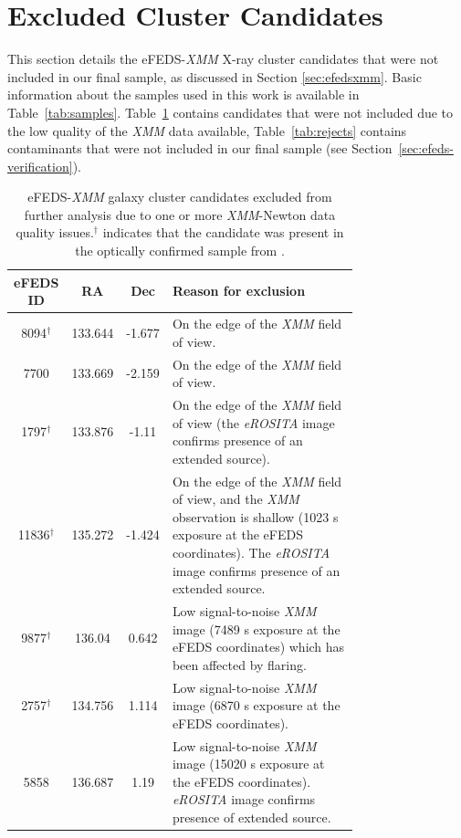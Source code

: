 \documentclass[fleqn,usenatbib]{mnras}
\begin{document}
\section{Excluded Cluster Candidates}
\label{app:rejected}

This section details the eFEDS-{\em XMM} X-ray cluster candidates that were not included in our final sample, as discussed in Section \ref{sec:efedsxmm}. Basic information about the samples used in this work is available in Table~\ref{tab:samples}. Table~\ref{tab:xmmrejects} contains candidates that were not included due to the low quality of the {\em XMM} data available, Table~\ref{tab:rejects} contains contaminants that were not included in our final sample (see Section~\ref{sec:efeds-verification}).

\begin{table}
\begin{center}
\caption[]{{eFEDS-{\em XMM} galaxy cluster candidates excluded from further analysis due to one or more {\em XMM}-Newton data quality issues.\newline $^\dagger$ indicates that the candidate was present in the optically confirmed sample from \cite{efedsclusteropticalcat}.}\label{tab:xmmrejects}}
\vspace{1mm}
\begin{tabular}{ccc|p{0.75\linewidth}}
\hline
\hline
eFEDS ID & RA & Dec & Reason for exclusion\\
\hline
\hline
8094$^\dagger$ & 133.644 & -1.677 & On the edge of the {\em XMM} field of view. \\ 
\hline
7700 & 133.669 & -2.159 & On the edge of the {\em XMM} field of view. \\ 
\hline
1797$^\dagger$ & 133.876 & -1.11 & On the edge of the {\em XMM} field of view (the {\em eROSITA} image confirms presence of an extended source). \\ 
\hline
11836$^\dagger$ & 135.272 & -1.424 & On the edge of the {\em XMM} field of view, and the {\em XMM} observation is shallow (1023 s exposure at the eFEDS coordinates). The {\em eROSITA} image confirms presence of an extended source. \\ 
\hline
9877$^\dagger$ & 136.04 & 0.642 & Low signal-to-noise {\em XMM} image (7489 s exposure at the eFEDS coordinates) which has been affected by flaring.  \\ 
\hline
2757$^\dagger$ & 134.756 & 1.114 & Low signal-to-noise {\em XMM} image (6870 s exposure at the eFEDS coordinates). \\ 
\hline
5858 & 136.687 & 1.19 & Low signal-to-noise {\em XMM} image (15020 s exposure at the eFEDS coordinates). {\em eROSITA} image confirms presence of extended source. \\ 

\end{tabular}
\end{center}
\end{table}
\end{document}
